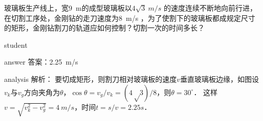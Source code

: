 \begin{example}
	玻璃板生产线上，宽\SI{9}{m}的成型玻璃板以$ 4\sqrt{3}~\si{m/s} $ 的速度连续不断地向前行进，在切割工序处，金刚钻的走刀速度为\SI{8}{m/s} ，为了使割下的玻璃板都成规定尺寸的矩形，金刚钻割刀的轨道应如何控制？切割一次的时间多长？
	
	\begin{taggedblock}{student}
		\vspace*{3cm}
	\end{taggedblock}
	
	
	\begin{taggedblock}{answer}
		答案：\SI{2.25}{m/s}
	\end{taggedblock}

	\begin{taggedblock}{analysis}
		解析： 要切成矩形，则割刀相对玻璃板的速度$ v $垂直玻璃板边缘，如图设$v_k$与$v_g$方向夹角为$ \theta $，$\cos\theta=v_g/v_k =(4√3)/8$，则$\theta=30^\circ$．
	这样$v = \sqrt{v_k^2-v_g^2} = \SI{4}{m/s}  $，时间$t=s/v=2.25\si{s} $．
	\end{taggedblock}
\end{example}


